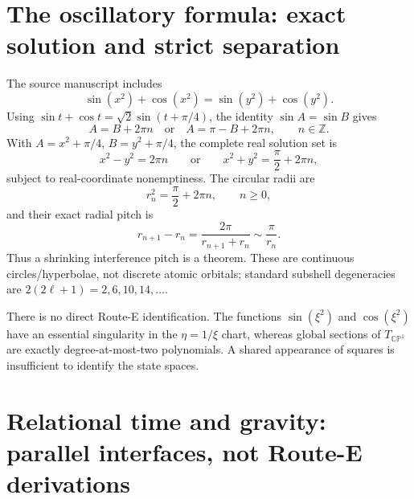 \documentclass[11pt]{article}
\numberwithin{equation}{section}
\newcommand{\CP}{\mathbb{CP}}
\begin{document}
\section{The oscillatory formula: exact solution and strict separation}

The source manuscript includes
\begin{equation}
 \sin(x^2)+\cos(x^2)=\sin(y^2)+\cos(y^2).
 \label{eq:sourceosc}
\end{equation}
Using \(\sin t+\cos t=\sqrt2\sin(t+\pi/4)\), the identity
\(\sin A=\sin B\) gives
\begin{equation}
 A=B+2\pi n\quad\text{or}\quad A=\pi-B+2\pi n,
 \qquad n\in\mathbb Z.
\end{equation}
With \(A=x^2+\pi/4\), \(B=y^2+\pi/4\), the complete real solution set is
\begin{equation}
 \boxed{x^2-y^2=2\pi n}
 \qquad\text{or}\qquad
 \boxed{x^2+y^2=\frac\pi2+2\pi n},
 \label{eq:oscsolutions}
\end{equation}
subject to real-coordinate nonemptiness.  The circular radii are
\begin{equation}
 r_n^2=\frac\pi2+2\pi n,\qquad n\ge0,
\end{equation}
and their exact radial pitch is
\begin{equation}
 r_{n+1}-r_n=\frac{2\pi}{r_{n+1}+r_n}
 \sim\frac\pi{r_n}.
 \label{eq:pitch}
\end{equation}
Thus a shrinking interference pitch is a theorem.  These are continuous
circles/hyperbolae, not discrete atomic orbitals; standard subshell
degeneracies are \(2(2\ell+1)=2,6,10,14,\ldots\).

There is no direct Route-E identification.  The functions
\(\sin(\xi^2)\) and \(\cos(\xi^2)\) have an essential singularity in the
\(\eta=1/\xi\) chart, whereas global sections of \(T_{\CP^1}\) are exactly
degree-at-most-two polynomials.  A shared appearance of squares is
insufficient to identify the state spaces.

\section{Relational time and gravity: parallel interfaces, not Route-E derivations}
\end{document}
